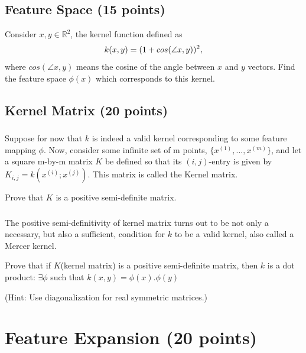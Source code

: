 \documentclass[a4paper]{article}
\begin{document}
	\subsection{Feature Space (15 points)}
	Consider $x, y \in \mathbb{R}^2$, the kernel function defined as 
	$$k(x,y) = (1+cos\\
	(\angle x,y))^2 ,$$
	where $cos(\angle x,y)$ means the cosine of the angle between $x$ and $y$ vectors. Find the feature space $\phi(x)$ which corresponds to this kernel.
 
	\subsection{Kernel Matrix (20 points)}
	\subsubsection{}
	Suppose for now that $k$ is indeed a valid kernel corresponding to some
	feature mapping $\phi$. Now, consider some infinite set of m points, $\{x^{(1)},...,x^{(m)}\}$, and let a square m-by-m matrix $K$ be
	defined so that its $(i,j)$-entry is given by $K_{i,j} = k(x^{(i)}; x^{(j)})$. This matrix is called the Kernel matrix. 
	
	Prove that $K$ is a positive semi-definite matrix.
	
	\subsubsection{}
	The positive semi-definitivity of kernel matrix turns out to be not only a necessary, but also a sufficient, condition for $k$ to be a valid kernel, also called a Mercer kernel.
	
	Prove that if $K$(kernel matrix) is a positive semi-definite matrix, then $k$ is a dot product: $\exists \phi$ such that $k(x,y) = \phi(x).\phi(y)$
	
	(Hint: Use diagonalization for real symmetric matrices.)
	
	\bigskip
	
	
	\section{Feature Expansion (20 points)}
	
\end{document}
